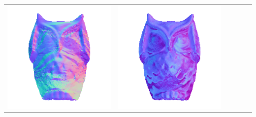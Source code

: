 \begin{center}
\begin{tabularx}{\linewidth}{@{}Y@{}Y@{}Y@{}Y@{}Y@{}Y@{}}
\includegraphics[width=\linewidth]{semisynthetic/20160617_15_yu_out.png} &
\includegraphics[width=\linewidth]{semisynthetic/20160617_15_dpsn_out.png} &

\end{tabularx}
\end{center}
